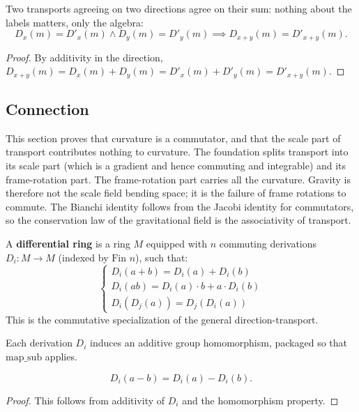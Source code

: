 \begin{theorem}
Two transports agreeing on two directions agree on their sum: nothing about the labels matters, only the algebra:
\[
D_x(m) = D'_x(m) \land D_y(m) = D'_y(m) \implies D_{x+y}(m) = D'_{x+y}(m).
\]
\begin{proof}
By additivity in the direction, $D_{x+y}(m) = D_x(m) + D_y(m) = D'_x(m) + D'_y(m) = D'_{x+y}(m)$.
\end{proof}
\end{theorem}

\subsection{Connection}

This section proves that curvature is a commutator, and that the scale part of transport contributes nothing to curvature. The foundation splits transport into its scale part (which is a gradient and hence commuting and integrable) and its frame-rotation part. The frame-rotation part carries all the curvature. Gravity is therefore not the scale field bending space; it is the failure of frame rotations to commute. The Bianchi identity follows from the Jacobi identity for commutators, so the conservation law of the gravitational field is the associativity of transport.

\begin{definition}
A \textbf{differential ring} is a ring $M$ equipped with $n$ commuting derivations $D_i : M \to M$ (indexed by $\text{Fin } n$), such that:
\[
\begin{cases}
D_i(a + b) = D_i(a) + D_i(b)\\
D_i(ab) = D_i(a) \cdot b + a \cdot D_i(b)\\
D_i(D_j(a)) = D_j(D_i(a))
\end{cases}
\]
This is the commutative specialization of the general direction-transport.
\end{definition}

\begin{definition}
Each derivation $D_i$ induces an additive group homomorphism, packaged so that $\text{map\_sub}$ applies.
\end{definition}

\begin{theorem}
\[
D_i(a - b) = D_i(a) - D_i(b).
\]
\begin{proof}
This follows from additivity of $D_i$ and the homomorphism property.
\end{proof}
\end{theorem}

